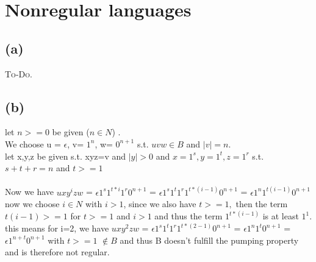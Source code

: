 


\setcounter{section}{2}

\section{Nonregular languages}

\subsection{(a)}

\textsc{To-Do.}

\subsection{(b)}

let $n >= 0$ be given ($n \in N $) .\\
We choose u = $\epsilon$, v= $1^n$, w= $0^{n+1}$ s.t. $uvw \in B$ and $|v| = n$.\\
let x,y,z be given s.t. xyz=v and $|y| > 0$ and $x=1^s,y=1^t,z=1^r $ s.t. $ s+t+r = n $ and $ t>=1$\\
\\
Now we have $uxy^izw$ = $\epsilon 1^s 1^{t*i} 1^r 0^{n+1}$ = $\epsilon 1^s 1^t 1^r 1^{t * (i-1)} 0^{n+1}$ = $\epsilon 1^n 1^{t(i-1)}0^{n+1}$\\

 now we choose $i \in N$ with $i > 1$, since we also have $t >= 1, $ then the term $t(i-1) >= 1$ for $t >= 1$ and $i > 1$ and thus the term $1^{t * (i-1)}$ is at least $1^1$. this means for i=2, we have  $uxy^2zw$ = $\epsilon 1^s 1^t 1^r 1^{t * (2-1)} 0^{n+1}$ = $\epsilon 1^n 1^{t}0^{n+1}$ = $\epsilon 1^{n + t}0^{n+1}$ with $t>=1$ $ \notin B$ and thus B doesn't fulfill the pumping property and is therefore not regular.   


